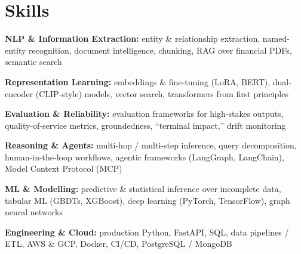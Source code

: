 \documentclass[10pt,a4paper]{article}
\begin{document}
\section{Skills}
\begin{tight}
  \item[\textcolor{accent}{\small$\bullet$}] \textbf{NLP \& Information Extraction:} entity \& relationship extraction, named-entity recognition, document intelligence, chunking, RAG over financial PDFs, semantic search
  \item[\textcolor{accent}{\small$\bullet$}] \textbf{Representation Learning:} embeddings \& fine-tuning (LoRA, BERT), dual-encoder (CLIP-style) models, vector search, transformers from first principles
  \item[\textcolor{accent}{\small$\bullet$}] \textbf{Evaluation \& Reliability:} evaluation frameworks for high-stakes outputs, quality-of-service metrics, groundedness, ``terminal impact,'' drift monitoring
  \item[\textcolor{accent}{\small$\bullet$}] \textbf{Reasoning \& Agents:} multi-hop / multi-step inference, query decomposition, human-in-the-loop workflows, agentic frameworks (LangGraph, LangChain), Model Context Protocol (MCP)
  \item[\textcolor{accent}{\small$\bullet$}] \textbf{ML \& Modelling:} predictive \& statistical inference over incomplete data, tabular ML (GBDTs, XGBoost), deep learning (PyTorch, TensorFlow), graph neural networks
  \item[\textcolor{accent}{\small$\bullet$}] \textbf{Engineering \& Cloud:} production Python, FastAPI, SQL, data pipelines / ETL, AWS \& GCP, Docker, CI/CD, PostgreSQL / MongoDB
\end{tight}

\end{document}

